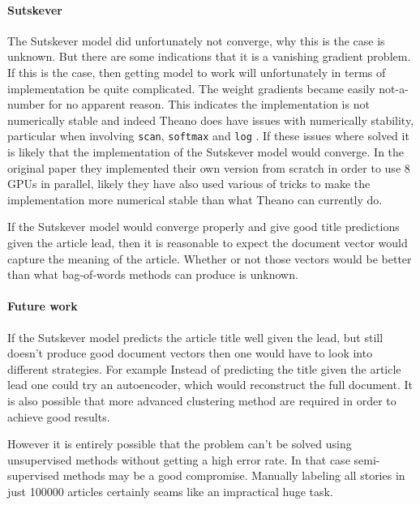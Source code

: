 \paragraph{Sutskever} The Sutskever model did unfortunately not converge, why this is the case is unknown. But there are some indications that it is a vanishing gradient problem. If this is the case, then getting model to work will unfortunately in terms of implementation be quite complicated. The weight gradients became easily not-a-number for no apparent reason. This indicates the implementation is not numerically stable and indeed Theano does have issues with numerically stability, particular when involving \texttt{scan}, \texttt{softmax} and \texttt{log} \cite{theano-issue}. If these issues where solved it is likely that the implementation of the Sutskever model would converge. In the original paper \cite{sutskever} they implemented their own version from scratch in order to use 8 GPUs in parallel, likely they have also used various of tricks to make the implementation more numerical stable than what Theano can currently do.

If the Sutskever model would converge properly and give good title predictions given the article lead, then it is reasonable to expect the document vector would capture the meaning of the article. Whether or not those vectors would be better than what bag-of-words methods can produce is unknown.

\paragraph{Future work} If the Sutskever model predicts the article title well given the lead, but still doesn't produce good document vectors then one would have to look into different strategies. For example Instead of predicting the title given the article lead one could try an autoencoder, which would reconstruct the full document. It is also possible that more advanced clustering method are required in order to achieve good results.

However it is entirely possible that the problem can't be solved using unsupervised methods without getting a high error rate. In that case semi-supervised methods may be a good compromise. Manually labeling all stories in just 100000 articles certainly seams like an impractical huge task.
 
